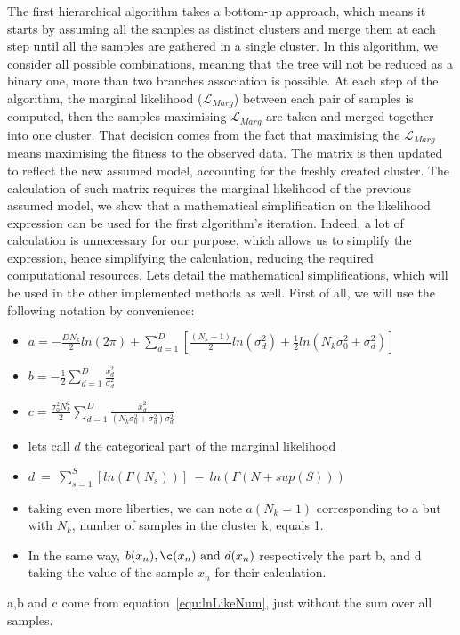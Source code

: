 \documentclass[twocolumn]{article}
\begin{document}
The first hierarchical algorithm takes a bottom-up approach, which means it starts by assuming all the samples as distinct clusters and merge them at each step until all the samples are gathered in a single cluster.
In this algorithm, we consider all possible combinations, meaning that the tree will not be reduced as a binary one, more than two branches association is possible.
At each step of the algorithm, the marginal likelihood ($\mathcal{L}_{Marg}$) between each pair of samples is computed, then the samples maximising $\mathcal{L}_{Marg}$ are taken and merged together into one cluster. That decision comes from the fact that maximising the $\mathcal{L}_{Marg}$ means maximising the fitness to the observed data.
The matrix is then updated to reflect the new assumed model, accounting for the freshly created cluster.
The calculation of such matrix requires the marginal likelihood of the previous assumed model, we show that a mathematical simplification on the likelihood expression can be used for the first algorithm's iteration.
Indeed, a lot of calculation is unnecessary for our purpose, which allows us to simplify the expression, hence simplifying the calculation, reducing the required computational resources.
Lets detail the mathematical simplifications, which will be used in the other implemented methods as well.
First of all, we will use the following notation by convenience:
\begin{itemize}
    \item $a=-\frac{DN_k}{2}ln(2\pi)+\sum_{d=1}^D[\frac{(N_k-1)}{2}ln(\sigma_d^2)+\frac{1}{2}ln(N_k\sigma_0^2+\sigma_d^2)]$
    \item $b=-\frac{1}{2}\sum_{d=1}^D\frac{x_{d}^2}{\sigma_d^2}$
    \item $c=\frac{\sigma_0^2N_k^2}{2}\sum_{d=1}^D\frac{\overline{x}_d^2}{(N_k\sigma_0^2+\sigma_d^2)\sigma_d^2}$
    \item lets call $d$ the categorical part of the marginal likelihood
    \item $d\ =\ \sum_{s=1}^S[ln(\Gamma(N_s))]\ -\ ln(\Gamma(N+sup(S)))$
    \item taking even more liberties, we can note $a(N_k=1)$ corresponding to a but with $N_k$, number of samples in the cluster k, equals 1.
    \item In the same way, $b(x_n),\c(x_n)\ \text{and}\ d(x_n)$ respectively the part b, and d taking the value of the sample $x_n$ for their calculation.
\end{itemize}
a,b and c come from equation~\ref{equ:lnLikeNum}, just without the sum over all samples.
\end{document}
